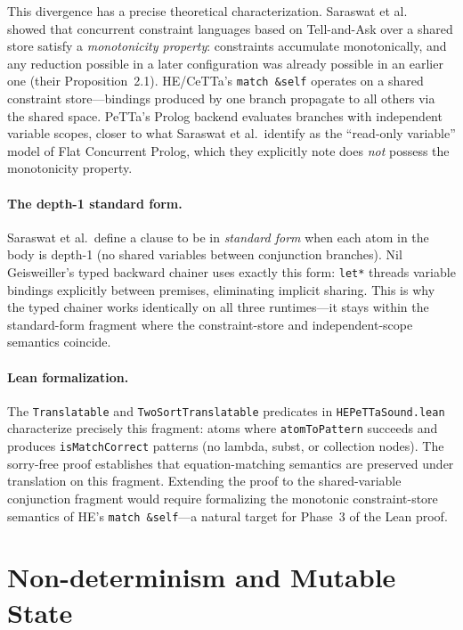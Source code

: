 \documentclass[11pt]{article}
\newcommand{\code}[1]{\texttt{#1}}
\newcommand{\PeTTa}{\textup{PeTTa}}
\newcommand{\HE}{\textup{HE}}
\newcommand{\CeTTa}{\textup{CeTTa}}
\begin{document}
This divergence has a precise theoretical characterization.
Saraswat et al.~\cite{saraswat1988} showed that concurrent constraint
languages based on Tell-and-Ask over a shared store satisfy a
\emph{monotonicity property}: constraints accumulate monotonically,
and any reduction possible in a later configuration was already
possible in an earlier one (their Proposition~2.1).  \HE{}/\CeTTa{}'s
\code{match~\&self} operates on a shared constraint store---bindings
produced by one branch propagate to all others via the shared space.
\PeTTa{}'s Prolog backend evaluates branches with independent variable
scopes, closer to what Saraswat et al.\ identify as the
``read-only variable'' model of Flat Concurrent Prolog, which they
explicitly note does \emph{not} possess the monotonicity property.

\paragraph{The depth-1 standard form.}
Saraswat et al.\ define a clause to be in \emph{standard form} when
each atom in the body is depth-1 (no shared variables between
conjunction branches).  Nil Geisweiller's typed backward chainer
uses exactly this form: \code{let*} threads variable bindings
explicitly between premises, eliminating implicit sharing.  This is
why the typed chainer works identically on all three runtimes---it
stays within the standard-form fragment where the constraint-store
and independent-scope semantics coincide.

\paragraph{Lean formalization.}
The \code{Translatable} and \code{TwoSortTranslatable} predicates in
\code{HEPeTTaSound.lean} characterize precisely this fragment: atoms
where \code{atomToPattern} succeeds and produces
\code{isMatchCorrect} patterns (no lambda, subst, or collection
nodes).  The sorry-free proof establishes that equation-matching
semantics are preserved under translation on this fragment.  Extending
the proof to the shared-variable conjunction fragment would require
formalizing the monotonic constraint-store semantics of \HE{}'s
\code{match~\&self}---a natural target for Phase~3 of the Lean proof.

\section{Non-determinism and Mutable State}
\label{sec:nondet-state}
\end{document}
